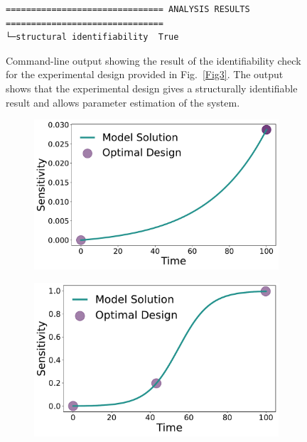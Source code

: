 \documentclass[graybox]{svmult}
\begin{document}
%
\begin{figure}
    \begin{verbatim}
=============================== ANALYSIS RESULTS ===============================
└─structural identifiability  True
    \end{verbatim}
    \caption{Command-line output showing the result of the identifiability check for the experimental design provided in Fig.~\ref{Fig3}.
    The output shows that the experimental design gives a structurally identifiable result and allows parameter estimation of the system.}
    \label{Fig6}
\end{figure}
%
%
\begin{figure}[H]
    \begin{subfigure}{.5\textwidth}
      \centering
      \includegraphics[scale=0.25]{Figures/Fig7a.pdf}
    \end{subfigure}
    \begin{subfigure}{.5\textwidth}
        \centering
        \includegraphics[scale=0.25]{Figures/Fig7b.pdf}

\end{subfigure}
\end{figure}
\end{document}
